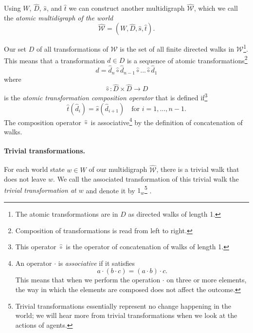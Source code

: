 Using $W$, $\hat{D}$, $\hat{s}$, and $\hat{t}$ we can construct another multidigraph $\hat{\mathscr{W}}$, which we call the \emph{atomic multidigraph of the world}
\begin{equation}
	\hat{\mathscr{W}} = (W, \hat{D}, \hat{s}, \hat{t}).
\end{equation}

Our set $D$ of all transformations of $\mathscr{W}$ is the set of all finite directed walks in $\mathscr{W}$\footnote{
	The atomic transformations are in $D$ as directed walks of length 1.
}.
This means that a transformation $d \in D$ is a sequence of atomic transformations\footnote{
	Composition of transformations is read from left to right.
}
\begin{equation}
	d = \hat{d}_{n} \hat{\circ} \hat{d}_{n-1} \hat{\circ} ... \hat{\circ} \hat{d}_{1}
\end{equation}
where
\begin{equation}
	\hat{\circ}: \hat{D} \times \hat{D} \to D
\end{equation}
is the \emph{atomic transformation composition operator} that is defined if\footnote{
This operator $\hat{\circ}$ is the operator of concatenation of walks of length 1.
}
\begin{equation}
	\hat{t}(\hat{d}_{i}) = \hat{s}(\hat{d}_{i+1}) \quad \text{for $i = 1, ..., n-1$}.
\end{equation}
The composition operator $\hat{\circ}$ is associative\footnote{
An operator $\cdot$ is \emph{associative} if it satisfies
\begin{equation}
	a \cdot (b \cdot c) = (a \cdot b) \cdot c.
\end{equation}
This means that when we perform the operation $\cdot$ on three or more elements, the way in which the elements are composed does not affect the outcome.
}
by the definition of concatenation of walks.


\paragraph{Trivial transformations.}
For each world state $w \in W$ of our multidigraph $\hat{\mathscr{W}}$, there is a trivial walk that does not leave $w$.
We call the associated transformation of this trivial walk the \emph{trivial transformation at $w$} and denote it by $1_{w}$\footnote{Trivial transformations essentially represent no change happening in the world; we will hear more from trivial transformations when we look at the actions of agents.}
.

